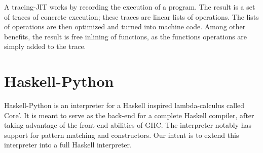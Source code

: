 A tracing-JIT works by recording the execution of a program. The result is a set of 
traces of concrete execution; these traces are linear lists of operations. The lists of
operations are then optimized and turned into machine code. Among other benefits, the
result is free inlining of functions, as the functions operations are simply added to
the trace. \cite{bolz2011runtime}

\section{Haskell-Python}

Haskell-Python\cite{haskellpython}
is an interpreter for a Haskell inspired lambda-calculus called Core'. 
It is meant to serve as the back-end for a complete Haskell compiler, after taking advantage 
of the front-end abilities of GHC. The interpreter notably has support for pattern matching 
and constructors. Our intent is to extend this interpreter into a full Haskell interpreter.


